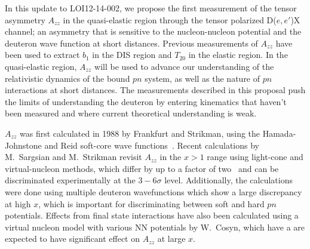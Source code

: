 In this update to LOI12-14-002, we propose the first measurement of the tensor asymmetry $A_{zz}$ in the quasi-elastic region through the tensor polarized D($e,e'$)X channel; an asymmetry that is sensitive to the nucleon-nucleon potential and the deuteron wave function at short distances.  Previous measurements of $A_{zz}$ have been used to extract $b_1$ in the DIS region and $T_{20}$ in the elastic region. In the quasi-elastic region, $A_{zz}$ will be used to advance our understanding of the relativistic dynamics of the bound $pn$ system, as well as the nature of $pn$ interactions at short distances. The measurements described in this proposal push the limits of understanding the deuteron by entering kinematics that haven't been measured and where current theoretical understanding is weak.


$A_{zz}$ was first calculated in 1988 by Frankfurt and Strikman, using the Hamada-Johnstone and Reid soft-core wave functions~\cite{Frankfurt:1988nt}. Recent calculations by
M.~Sargsian and M.~Strikman revisit $A_{zz}$ in the $x > 1$ range using light-cone and virtual-nucleon methods, which differ by up to a factor of two~\cite{MISAK} and can be discriminated experimentally at the $3-6\sigma$ level. Additionally, the calculations were done using multiple deuteron wavefunctions which show a large discrepancy at high $x$, which is important for discriminating between soft and hard $pn$ potentials. Effects from final state interactions have also been calculated using a virtual nucleon model with various NN potentials by W.~Cosyn, which have a are expected to have significant effect on $A_{zz}$ at large $x$.


